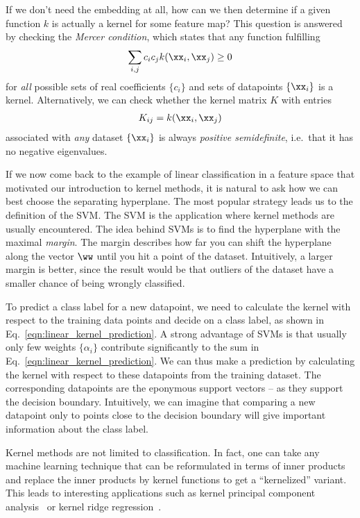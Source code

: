 \documentclass[twocolumn,superscriptaddress,nofootinbib]{revtex4-2}
\begin{document}
If we don't need the embedding at all, how can we then determine if a given function $k$ is actually a kernel for some feature map? This question is answered by checking the \emph{Mercer condition}, which states that any function fulfilling
\begin{align}
    \sum_{i,j} c_i c_j k(\xx_i, \xx_j) \geq 0
\end{align}
for \emph{all} possible sets of real coefficients $\{c_i \}$ and sets of datapoints $\{ \xx_i \}$ is a kernel. Alternatively, we can check whether the kernel matrix $K$ with entries
\begin{align}
    K_{ij} = k(\xx_i, \xx_j)
\end{align}
associated with \emph{any} dataset $\{ \xx_i \}$ is always \emph{positive semidefinite}, i.e.\ that it has no negative eigenvalues.

If we now come back to the example of linear classification in a feature space that motivated our introduction to kernel methods, it is natural to ask how we can best choose the separating hyperplane.
The most popular strategy leads us to the definition of the \ac{SVM}. 
The \ac{SVM} is the application where kernel methods are usually encountered. 
The idea behind \acp{SVM} is to find the hyperplane with the maximal \emph{margin}. 
The margin describes how far you can shift the hyperplane along the vector $\ww$ until you hit a point of the dataset. 
Intuitively, a larger margin is better, since the result would be that outliers of the dataset have a smaller chance of being wrongly classified. 

To predict a class label for a new datapoint, we need to calculate the kernel with respect to the training data points and decide on a class label, as shown in Eq.~\eqref{eqn:linear_kernel_prediction}. A strong advantage of \acp{SVM} is that usually only few weights $\{\alpha_i \}$ contribute significantly to the sum in Eq.~\eqref{eqn:linear_kernel_prediction}. We can thus make a prediction by calculating the kernel with respect to these datapoints from the training dataset. The corresponding datapoints are the eponymous support vectors -- as they support the decision boundary. Intuitively, we can imagine that comparing a new datapoint only to points close to the decision boundary will give important information about the class label.

Kernel methods are not limited to classification. In fact, one can take any machine learning technique that can be reformulated in terms of inner products and replace the inner products by kernel functions to get a \enquote{kernelized} variant. This leads to interesting applications such as kernel principal component analysis~\cite{goos1997kernel} or kernel ridge regression~\cite{saunders1998ridge}.
\end{document}
